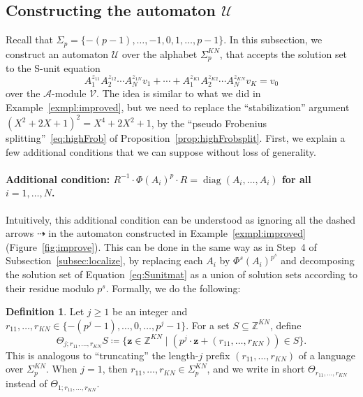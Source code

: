 \documentclass[letterpaper, 11pt, thm-restate]{article}
\numberwithin{equation}{section}
\newcommand{\Z}{\mathbb{Z}}
\newcommand{\diag}{\operatorname{diag}}
\newcommand{\mV}{\mathcal{V}}
\newcommand{\mA}{\mathcal{A}}
\newcommand{\mmU}{\mathscr{U}}
\newcommand{\bz}{\boldsymbol{z}}
\theoremstyle{definition}
\newtheorem{defn}[thrm]{Definition}
\theoremstyle{definition}
\theoremstyle{definition}
\begin{document}
\subsection{Constructing the automaton $\mmU$}\label{subsec:automaton}
Recall that
$
\Sigma_p = \{-(p-1), \ldots, -1, 0, 1, \ldots, p-1\}
$.
In this subsection, we construct an automaton $\mmU$ over the alphabet $\Sigma_p^{KN}$, that accepts the solution set to the S-unit equation
\begin{equation}\label{eq:Sunitmat}
    A_1^{z_{11}} A_2^{z_{12}} \cdots A_N^{z_{1N}} v_1 + \cdots + A_1^{z_{K1}} A_2^{z_{K2}} \cdots A_N^{z_{KN}} v_K = v_0
\end{equation}
over the $\mA$-module $\mV$.
The idea is similar to what we did in Example~\ref{exmpl:improved}, but we need to replace the ``stabilization'' argument $(X^2+ 2X +1)^2 = X^4+ 2X^2 +1$, by the ``pseudo Frobenius splitting''~\eqref{eq:highFrob} of Proposition~\ref{prop:highFrobsplit}.
First, we explain a few additional conditions that we can suppose without loss of generality.

\paragraph{Additional condition: $R^{-1} \cdot \Phi(A_i)^{p} \cdot R = \diag(A_i, \ldots, A_i)$ for all $i = 1, \ldots, N$.}

Intuitively, this additional condition can be understood as ignoring all the dashed arrows $\dashrightarrow$ in the automaton constructed in Example~\ref{exmpl:improved} (Figure~\ref{fig:improve}).
This can be done in the same way as in Step~4 of Subsection~\ref{subsec:localize}, by replacing each $A_i$ by $\Phi^s(A_i)^{p^s}$ and decomposing the solution set of Equation~\eqref{eq:Sunitmat} as a union of solution sets according to their residue modulo $p^s$.
Formally, we do the following:
\begin{defn}\label{def:theta}
    Let $j \geq 1$ be an integer and $r_{11}, \ldots, r_{KN} \in \{-(p^j-1), \ldots, 0, \ldots, p^j-1\}$.
    For a set $S \subseteq \Z^{KN}$, define 
    \[
    \Theta_{j; r_{11}, \ldots, r_{KN}} S \coloneqq \{\bz \in \Z^{KN} \mid \left(p^j \cdot \bz + (r_{11}, \ldots, r_{KN})\right) \in S\}.
    \]
    This is analogous to ``truncating'' the length-$j$ prefix $(r_{11}, \ldots, r_{KN})$ of a language over $\Sigma_p^{KN}$.
    When $j = 1$, then $r_{11}, \ldots, r_{KN} \in \Sigma_p^{KN}$, and we write in short $\Theta_{r_{11}, \ldots, r_{KN}}$ instead of $\Theta_{1; r_{11}, \ldots, r_{KN}}$.
\end{defn}
\end{document}
